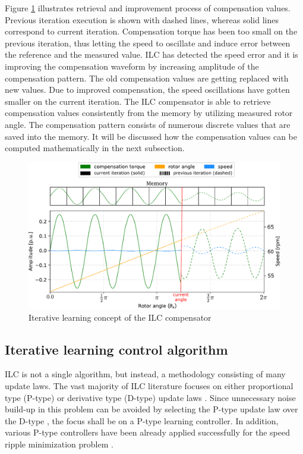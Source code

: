Figure \ref{fig:ilc_concept2} illustrates retrieval and improvement process of compensation values. Previous iteration execution is shown with dashed lines, whereas solid lines correspond to current iteration. Compensation torque has been too small on the previous iteration, thus letting the speed to oscillate and induce error between the reference and the measured value. ILC has detected the speed error and it is improving the compensation waveform by increasing amplitude of the compensation pattern. The old compensation values are getting replaced with new values. Due to improved compensation, the speed oscillations have gotten smaller on the current iteration. The ILC compensator is able to retrieve compensation values consistently from the memory by utilizing measured rotor angle. The compensation pattern consists of numerous discrete values that are saved into the memory. It will be discussed how the compensation values can be computed mathematically in the next subsection.
\begin{figure}[htb] 
    \centering
    \includegraphics[width=\textwidth]{images/compensation-scheme.pdf}
    \caption{Iterative learning concept of the ILC compensator}
    \label{fig:ilc_concept2}
\end{figure}


\subsection{Iterative learning control algorithm}
ILC is not a single algorithm, but instead, a methodology consisting of many update laws. The vast majority of ILC literature focuses on either proportional type (P-type) or derivative type (D-type) update laws \cite{ILC:1998}. Since unnecessary noise build-up in this problem can be avoided by selecting the P-type update law over the D-type \cite{ILC:2005, ILC:2018}, the focus shall be on a P-type learning controller. In addition, various P-type controllers have been already applied successfully for the speed ripple minimization problem \cite{ILC:2004, ILC:2005, ILC:2012, ILC:2018}.

